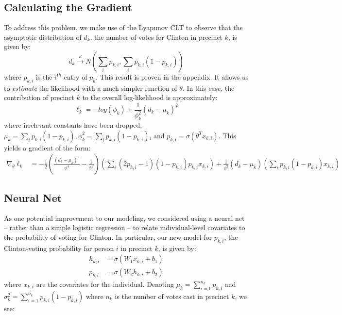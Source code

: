 \documentclass[10pt, letterpaper]{article}
\begin{document}
\subsection{Calculating the Gradient}

To address this problem, we make use of the Lyapunov CLT \cite{LyapunovCondition} to observe that the asymptotic distribution of $d_k$, the number of votes for Clinton in precinct $k$, is given by: 
\[ d_k \stackrel{d} \longrightarrow N \left(\sum_{i} p_{k,i}, \sum_{i} p_{k, i}(1-p_{k, i}) \right) \] 
where $p_{k, i}$ is the $i^{th}$ entry of $p_k$. This result is proven in the appendix. It allows us to \emph{estimate} the likelihood with a much simpler function of $\theta$. In this case, the contribution of precinct $k$ to the overall log-likelihood is approximately: 
\[ \ell_k = -log \left( \phi_k\right) + \frac{1}{\phi_k^2} \left( d_k -\mu_k \right)^2  \] 
where irrelevant constants have been dropped, $\mu_k =  \sum_{i} p_{k, i}(1-p_{k, i}), \phi_k^2 = \sum_{i} p_{k, i}(1-p_{k, i})$, and $p_{k, i} = \sigma(\theta^T x_{k, i})$. This yields a gradient of the form: 
\begin{align*}
\nabla_{\theta} \ell_k &=  -\frac{1}{2} \left(\frac{(d_k - \mu_k)^2}{\phi^4} - \frac{1}{\phi^2} \right) \left( \sum_{i} (2 p_{k, i} - 1)(1-p_{k, i})p_{k, i}x_{k, i} \right) + \frac{1}{\phi^2} (d_k - \mu_k) \left( \sum_i p_{k, i} (1 - p_{k, i}) x_{k, i} \right)
\end{align*}

\subsection{Neural Net} 
As one potential improvement to our modeling, we considered using a neural net -- rather than a simple logistic regression -- to relate individual-level covariates to the probability of voting for Clinton. In particular, our new model for $p_{k, i}$, the Clinton-voting probability for person $i$ in precinct $k$, is given by: 
\begin{align*}
h_{k, i} &= \sigma\left(W_1 x_{k, i} + b_1 \right) \\
p_{k, i} &= \sigma\left(W_2 h_{k, i} + b_2 \right) 
\end{align*}
where $x_{k, i}$ are the covariates for the individual. Denoting $\mu_k = \sum_{i = 1}^{n_k} p_{k, i}$ and $\sigma_k^2 = \sum_{i = 1}^{n_k} p_{k, i} (1 - p_{k, i})$ where $n_k$ is the number of votes cast in precinct $k$, we see: 
\end{document}
